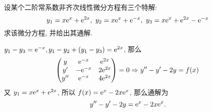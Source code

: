 
\begin{example}[1997 数二]
    设某个二阶常系数非齐次线性微分方程有三个特解:
    $$y_1=x\mathrm{e} ^x+\mathrm{e} ^{2x},~y_2=x\mathrm{e} ^x+\mathrm{e} ^{-x},~y_3=x\mathrm{e} ^x+\mathrm{e} ^{2x}-\mathrm{e} ^{-x}$$
    求该微分方程, 并给出其通解.
\end{example}
\begin{solution}
    $y_1-y_3=\mathrm{e} ^{-x}, y_1-y_2+(y_1-y_3)=\mathrm{e} ^{2x}$, 那么 $$
        \begin{pmatrix} y & \mathrm{e} ^{-x} & \mathrm{e} ^{2x} \\ y' & -\mathrm{e} ^{-x} & 2\mathrm{e} ^{2x} \\ y'' & \mathrm{e} ^{-x} & 4\mathrm{e} ^{2x} \\\end{pmatrix}=0\Rightarrow y''-y'-2y=f(x)
    $$
    又 $y_1=x\mathrm{e} ^{x}+\mathrm{e} ^{2x}$, 所以 $f(x)=\mathrm{e} ^{x}-2x\mathrm{e} ^{x}$, 那么通解为 $$
        y''-y'-2y=\mathrm{e} ^{x}-2x\mathrm{e} ^{x}.
    $$
\end{solution}

